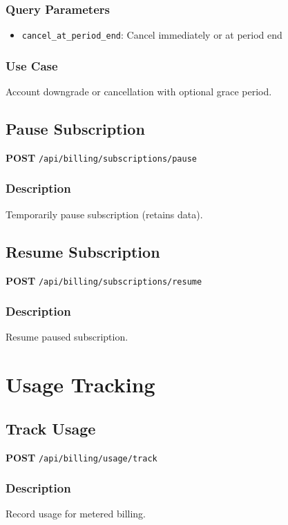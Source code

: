 \documentclass[11pt,a4paper]{report}
\begin{document}
\subsubsection{Query Parameters}
\begin{itemize}[leftmargin=*]
    \item \texttt{cancel\_at\_period\_end}: Cancel immediately or at period end
\end{itemize}

\subsubsection{Use Case}
Account downgrade or cancellation with optional grace period.

\subsection{Pause Subscription}

\textbf{POST} \texttt{/api/billing/subscriptions/pause}

\subsubsection{Description}
Temporarily pause subscription (retains data).

\subsection{Resume Subscription}

\textbf{POST} \texttt{/api/billing/subscriptions/resume}

\subsubsection{Description}
Resume paused subscription.

\section{Usage Tracking}

\subsection{Track Usage}

\textbf{POST} \texttt{/api/billing/usage/track}

\subsubsection{Description}
Record usage for metered billing.
\end{document}
